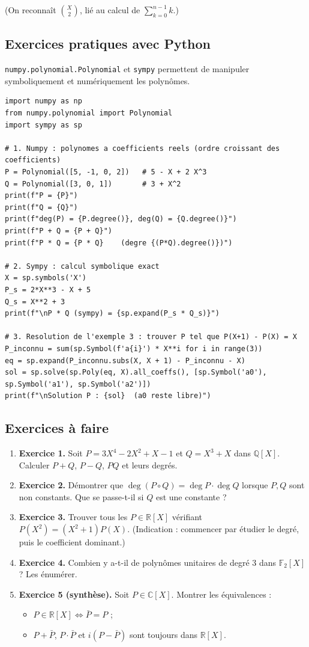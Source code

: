 (On reconnaît $\binom{X}{2}$, lié au calcul de $\sum_{k=0}^{n-1} k$.)

\subsection{Exercices pratiques avec Python}
\texttt{numpy.polynomial.Polynomial} et \texttt{sympy} permettent de manipuler symboliquement et numériquement les polynômes.

\begin{lstlisting}
import numpy as np
from numpy.polynomial import Polynomial
import sympy as sp

# 1. Numpy : polynomes a coefficients reels (ordre croissant des coefficients)
P = Polynomial([5, -1, 0, 2])   # 5 - X + 2 X^3
Q = Polynomial([3, 0, 1])       # 3 + X^2
print(f"P = {P}")
print(f"Q = {Q}")
print(f"deg(P) = {P.degree()}, deg(Q) = {Q.degree()}")
print(f"P + Q = {P + Q}")
print(f"P * Q = {P * Q}    (degre {(P*Q).degree()})")

# 2. Sympy : calcul symbolique exact
X = sp.symbols('X')
P_s = 2*X**3 - X + 5
Q_s = X**2 + 3
print(f"\nP * Q (sympy) = {sp.expand(P_s * Q_s)}")

# 3. Resolution de l'exemple 3 : trouver P tel que P(X+1) - P(X) = X
P_inconnu = sum(sp.Symbol(f'a{i}') * X**i for i in range(3))
eq = sp.expand(P_inconnu.subs(X, X + 1) - P_inconnu - X)
sol = sp.solve(sp.Poly(eq, X).all_coeffs(), [sp.Symbol('a0'), sp.Symbol('a1'), sp.Symbol('a2')])
print(f"\nSolution P : {sol}  (a0 reste libre)")
\end{lstlisting}

\subsection{Exercices à faire}
\begin{enumerate}
    \item \textbf{Exercice 1.} Soit $P = 3X^4 - 2X^2 + X - 1$ et $Q = X^3 + X$ dans $\mathbb{Q}[X]$. Calculer $P + Q$, $P - Q$, $PQ$ et leurs degrés.
    \item \textbf{Exercice 2.} Démontrer que $\deg(P \circ Q) = \deg P \cdot \deg Q$ lorsque $P, Q$ sont non constants. Que se passe-t-il si $Q$ est une constante ?
    \item \textbf{Exercice 3.} Trouver tous les $P \in \mathbb{R}[X]$ vérifiant $P(X^2) = (X^2 + 1) P(X)$. (Indication : commencer par étudier le degré, puis le coefficient dominant.)
    \item \textbf{Exercice 4.} Combien y a-t-il de polynômes unitaires de degré $3$ dans $\mathbb{F}_2[X]$ ? Les énumérer.
    \item \textbf{Exercice 5 (synthèse).} Soit $P \in \mathbb{C}[X]$. Montrer les équivalences :
    \begin{itemize}
        \item $P \in \mathbb{R}[X] \iff \bar{P} = P$ ;
        \item $P + \bar{P}$, $P \cdot \bar{P}$ et $i(P - \bar{P})$ sont toujours dans $\mathbb{R}[X]$.
    \end{itemize}
\end{enumerate}

